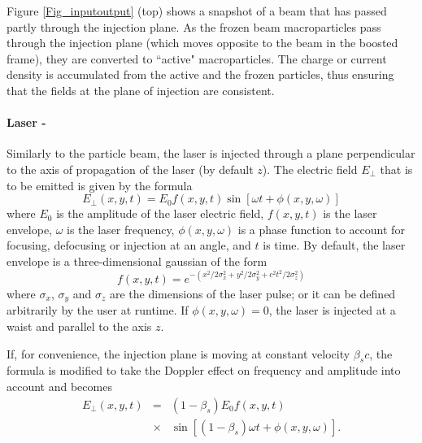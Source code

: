 Figure \ref{Fig_inputoutput} (top) shows a snapshot of a beam that has passed partly through the injection plane. As the frozen beam macroparticles pass through the injection plane (which moves opposite to the beam in the boosted frame), they are converted to ``active" macroparticles. The charge or current density is accumulated from the active and the frozen particles, thus ensuring that the fields at the plane of injection are consistent.

\paragraph{Laser - }

Similarly to the particle beam, the laser is injected through a plane perpendicular to the axis of propagation of the laser (by default $z$).
The electric field $E_\perp$ that is to be emitted is given by the formula
\begin{equation}
E_\perp\left(x,y,t\right)=E_0 f\left(x,y,t\right) \sin\left[\omega t+\phi\left(x,y,\omega\right)\right]
\end{equation}
where $E_0$ is the amplitude of the laser electric field, $f\left(x,y,t\right)$ is the laser envelope, $\omega$ is the laser frequency, $\phi\left(x,y,\omega\right)$ is a phase function to account for focusing, defocusing or injection at an angle, and $t$ is time. By default, the laser envelope is a three-dimensional gaussian of the form
\begin{equation}
 f\left(x,y,t\right)=e^{-\left(x^2/2 \sigma_x^2+y^2/2 \sigma_y^2+c^2t^2/2 \sigma_z^2\right)}
 \end{equation}
 where $\sigma_x$, $\sigma_y$ and $\sigma_z$ are the dimensions of the laser pulse; or it can be defined arbitrarily by the user at runtime.
If $\phi\left(x,y,\omega\right)=0$, the laser is injected at a waist and parallel to the axis $z$.

If, for convenience, the injection plane is moving at constant velocity $\beta_s c$, the formula is modified to take the Doppler effect on frequency and amplitude into account and becomes
\begin{eqnarray}
E_\perp\left(x,y,t\right)&=&\left(1-\beta_s\right)E_0 f\left(x,y,t\right)\nonumber \\
&\times& \sin\left[\left(1-\beta_s\right)\omega t+\phi\left(x,y,\omega\right)\right].
\end{eqnarray}

